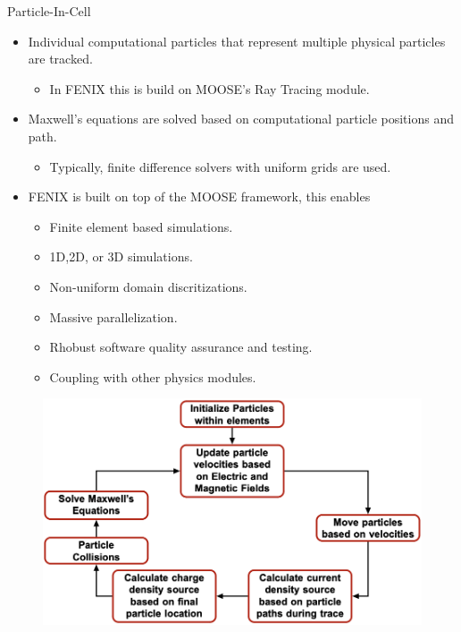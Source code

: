 \documentclass[aspectratio=169, 16pt]{beamer}
\begin{document}
\begin{frame}{Particle-In-Cell}
  \vfill{}
  \begin{itemize}
    \item Individual computational particles that represent multiple physical particles are tracked.
    \begin{itemize}
      \item In FENIX this is build on MOOSE's Ray Tracing module.
    \end{itemize}
    \item Maxwell's equations are solved based on computational particle positions and path. 
    \begin{itemize}
      \item Typically, finite difference solvers with uniform grids are used.
    \end{itemize}
    \item FENIX is built on top of the MOOSE framework, this enables
    \begin{itemize}
      \item Finite element based simulations.
      \item 1D,2D, or 3D simulations.
      \item Non-uniform domain discritizations.
      \item Massive parallelization.
      \item Rhobust software quality assurance and testing.
      \item Coupling with other physics modules.
    \end{itemize}
  \end{itemize}
\end{frame}

\begin{frame}
  \vspace{0.5cm}
  \begin{figure}[H]
    \includegraphics[height=0.8\textheight]{figs/flowchart.png}
  \end{figure}
\end{frame}
\end{document}
